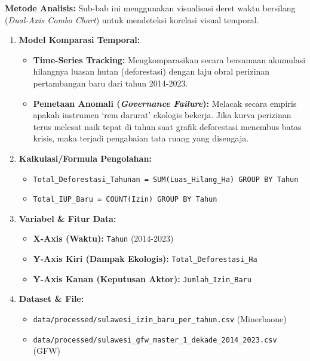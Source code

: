 \documentclass[
]{article}
\providecommand{\tightlist}{%
  \setlength{\itemsep}{0pt}\setlength{\parskip}{0pt}}
\begin{document}
\textbf{Metode Analisis:} Sub-bab ini menggunakan visualisasi deret
waktu bersilang (\emph{Dual-Axis Combo Chart}) untuk mendeteksi korelasi
visual temporal.

\begin{enumerate}
\def\labelenumi{\arabic{enumi}.}
\tightlist
\item
  \textbf{Model Komparasi Temporal:}

  \begin{itemize}
  \tightlist
  \item
    \textbf{Time-Series Tracking:} Mengkomparasikan secara bersamaan
    akumulasi hilangnya luasan hutan (deforestasi) dengan laju obral
    perizinan pertambangan baru dari tahun 2014-2023.
  \item
    \textbf{Pemetaan Anomali (\emph{Governance Failure}):} Melacak
    secara empiris apakah instrumen `rem darurat' ekologis bekerja. Jika
    kurva perizinan terus melesat naik tepat di tahun saat grafik
    deforestasi menembus batas krisis, maka terjadi pengabaian tata
    ruang yang disengaja.
  \end{itemize}
\item
  \textbf{Kalkulasi/Formula Pengolahan:}

  \begin{itemize}
  \tightlist
  \item
    \texttt{Total\_Deforestasi\_Tahunan\ =\ SUM(Luas\_Hilang\_Ha)\ GROUP\ BY\ Tahun}
  \item
    \texttt{Total\_IUP\_Baru\ =\ COUNT(Izin)\ GROUP\ BY\ Tahun}
  \end{itemize}
\item
  \textbf{Variabel \& Fitur Data:}

  \begin{itemize}
  \tightlist
  \item
    \textbf{X-Axis (Waktu):} \texttt{Tahun} (2014-2023)
  \item
    \textbf{Y-Axis Kiri (Dampak Ekologis):}
    \texttt{Total\_Deforestasi\_Ha}
  \item
    \textbf{Y-Axis Kanan (Keputusan Aktor):} \texttt{Jumlah\_Izin\_Baru}
  \end{itemize}
\item
  \textbf{Dataset \& File:}

  \begin{itemize}
  \tightlist
  \item
    \texttt{data/processed/sulawesi\_izin\_baru\_per\_tahun.csv}
    (Minerbaone)
  \item
    \texttt{data/processed/sulawesi\_gfw\_master\_1\_dekade\_2014\_2023.csv}
    (GFW)
  \end{itemize}
\end{enumerate}
\end{document}
